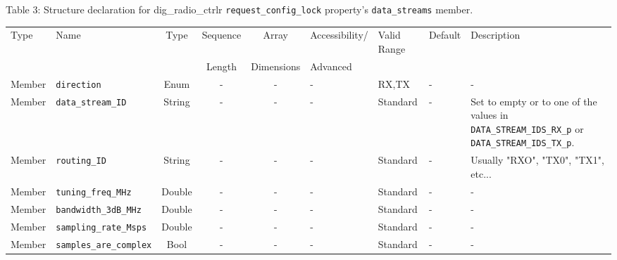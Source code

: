 \documentclass{article}
\def\comp{dig\_radio\_ctrlr}
\begin{document}
\begin{landscape}
	\noindent Table \hypertarget{tab3}{3}: Structure declaration for \comp{} \verb+request_config_lock+ property's \verb+data_streams+ member. \\
	\begin{scriptsize}
		\noindent\begin{longtable}{|p{1.8cm}|p{3.6cm}|c|c|c|p{2cm}|p{1.7cm}|p{1.0cm}|p{7.37cm}|}
			\hline
			\rowcolor{blue}
			Type         & Name                                & Type & Sequence & Array      & Accessibility/ & Valid Range  & Default & Description                                                                                                                                                                                                                 \\
			\rowcolor{blue}
			             &                                     &      & Length   & Dimensions & Advanced       &              &         &                                                                                                                                                                                                                             \\
			\hline
			Member       & \verb+direction+                    & Enum  & -       & -          & -              & RX,TX        & -       & - \\
			\hline
			Member       & \verb+data_stream_ID+               & String& -       & -          & -              & Standard     & -       & Set to empty or to one of the values in \verb+DATA_STREAM_IDS_RX_p+ or \verb+DATA_STREAM_IDS_TX_p+. \\
			\hline
			Member       & \verb+routing_ID+                   & String& -       & -          & -              & Standard     & -       & Usually "RXO", "TX0", "TX1", etc... \\
			\hline
			Member       & \verb+tuning_freq_MHz+              & Double & -       & -          & -              & Standard     & -       & - \\
			\hline
			Member       & \verb+bandwidth_3dB_MHz+              & Double & -       & -          & -              & Standard     & -       & - \\
			\hline
			Member       & \verb+sampling_rate_Msps+             & Double & -       & -          & -              & Standard     & -       & - \\
			\hline
			Member       & \verb+samples_are_complex+            & Bool   & -       & -          & -              & Standard     & -       & - \\

\end{longtable}
\end{scriptsize}
\end{landscape}
\end{document}
